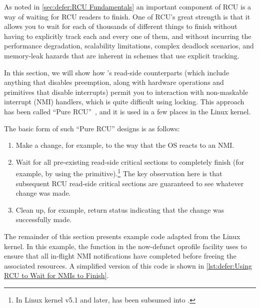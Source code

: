 As noted in \cref{sec:defer:RCU Fundamentals}
an important component
of RCU is a way of waiting for RCU readers to finish.
One of
RCU's great strength is that it allows you to wait for each of
thousands of different things to finish without having to explicitly
track each and every one of them, and without incurring
the performance degradation, scalability limitations, complex deadlock
scenarios, and memory-leak hazards that are inherent in schemes that
use explicit tracking.

In this section, we will show how 's
read-side counterparts (which include anything that disables preemption,
along with hardware operations and
primitives that disable interrupts) permit you to interaction with
non-maskable interrupt
(NMI) handlers, which is quite difficult using locking.
This approach has been called ``Pure RCU''~\cite{PaulEdwardMcKenneyPhD},
and it is used in a few places in the Linux kernel.

The basic form of such ``Pure RCU'' designs is as follows:

\begin{enumerate}
\item	Make a change, for example, to the way that the OS reacts to an NMI\@.
\item	Wait for all pre-existing read-side critical sections to
	completely finish (for example, by using the
	 primitive).\footnote{
		In Linux kernel v5.1 and later,  has
		been subsumed into .}
	The key observation here is that subsequent RCU read-side critical
	sections are guaranteed to see whatever change was made.
\item	Clean up, for example, return status indicating that the
	change was successfully made.
\end{enumerate}

The remainder of this section presents example code adapted from
the Linux kernel.
In this example, the  function in the now-defunct
oprofile facility uses  to ensure that all
in-flight NMI notifications have completed before freeing the associated
resources.
A simplified version of this code is shown in
\cref{lst:defer:Using RCU to Wait for NMIs to Finish}.

